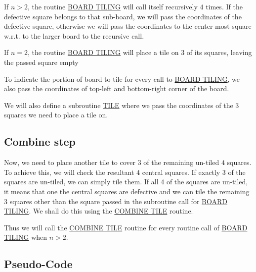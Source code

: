 \documentclass{article}
\begin{document}
If $n > 2$, the routine \underline{BOARD TILING} will call itself recursively $4$ times. If the defective square belongs to that sub-board, we will pass the coordinates of the defective square, otherwise we will pass the coordinates to the center-most square w.r.t. to the larger board to the recursive call.

If $n = 2$, the routine \underline{BOARD TILING} will place a tile on $3$ of its squares, leaving the passed square empty

To indicate the portion of board to tile for every call to \underline{BOARD TILING}, we also pass the coordinates of top-left and bottom-right corner of the board.

We will also define a subroutine \underline{TILE} where we pass the coordinates of the $3$ squares we need to place a tile on.

\subsection{Combine step}

Now, we need to place another tile to cover $3$ of the remaining un-tiled $4$ squares. To achieve this, we will check the resultant $4$ central squares. If exactly $3$ of the squares are un-tiled, we can simply tile them. If all $4$ of the squares are un-tiled, it means that one the central squares are defective and we can tile the remaining $3$ squares other than the square passed in the subroutine call for \underline{BOARD TILING}. We shall do this using the \underline{COMBINE TILE} routine.

Thus we will call the \underline{COMBINE TILE} routine for every routine call of \underline{BOARD TILING} when $n > 2$.

\subsection{Pseudo-Code}
\end{document}
